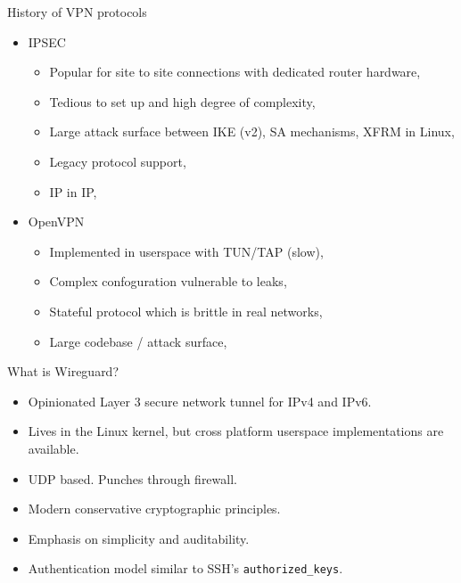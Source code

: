 \documentclass{beamer}
\begin{document}
    \begin{frame}{History of VPN protocols}
        \begin{itemize}
            \item IPSEC
                \begin{itemize}
                    \item Popular for site to site connections with dedicated router hardware,
                    \item Tedious to set up and high degree of complexity,
                    \item Large attack surface between IKE (v2), SA mechanisms, XFRM in Linux,
                    \item Legacy protocol support,
                    \item IP in IP,
                \end{itemize}
            \item OpenVPN
                \begin{itemize}
                    \item Implemented in userspace with TUN/TAP (slow),
                    \item Complex confoguration vulnerable to leaks,
                    \item Stateful protocol which is brittle in real networks,
                    \item Large codebase / attack surface,
                \end{itemize}
        \end{itemize}
    \end{frame}
    \begin{frame}{What is Wireguard?}
        \begin{itemize}
            \item Opinionated Layer 3 secure network tunnel for IPv4 and IPv6.
            \item Lives in the Linux kernel, but cross platform userspace implementations are available.
            \item UDP based. Punches through firewall.
            \item Modern conservative cryptographic principles.
            \item Emphasis on simplicity and auditability.
            \item Authentication model similar to SSH's \texttt{authorized\_keys}.
        \end{itemize}
    \end{frame}
\end{document}

